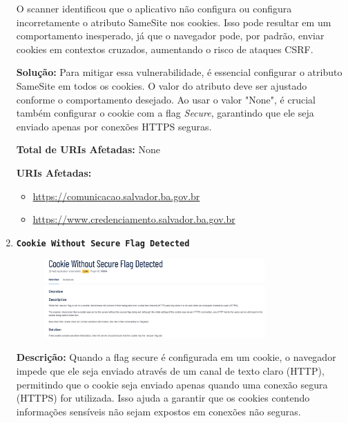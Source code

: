 \documentclass[a4paper,12pt]{article}
\begin{document}
\begin{enumerate}
O scanner identificou que o aplicativo não configura ou configura incorretamente o atributo SameSite nos cookies. Isso pode resultar em um comportamento inesperado, já que o navegador pode, por padrão, enviar cookies em contextos cruzados, aumentando o risco de ataques CSRF.

\textbf{Solução:} Para mitigar essa vulnerabilidade, é essencial configurar o atributo SameSite em todos os cookies. O valor do atributo deve ser ajustado conforme o comportamento desejado. Ao usar o valor "None", é crucial também configurar o cookie com a flag \textit{Secure}, garantindo que ele seja enviado apenas por conexões HTTPS seguras.

\textbf{Total de URIs Afetadas:} None

\textbf{URIs Afetadas:}
\begin{itemize}
    \item \url{https://comunicacao.salvador.ba.gov.br}
    \item \url{https://www.credenciamento.salvador.ba.gov.br}
\end{itemize}

\item \textbf{\texttt{Cookie Without Secure Flag Detected}}

                        \begin{figure}[h!]
                        \centering
                        \includegraphics[width=0.8\textwidth]{assets/images-was/Vulnerabilidades em Cookies e Segurança de Sessão/Cookie Without Secure Flag Detected.png}
                        \end{figure}
                        \FloatBarrier
                        \textbf{Descrição:} Quando a flag secure é configurada em um cookie, o navegador impede que ele seja enviado através de um canal de texto claro (HTTP), permitindo que o cookie seja enviado apenas quando uma conexão segura (HTTPS) for utilizada. Isso ajuda a garantir que os cookies contendo informações sensíveis não sejam expostos em conexões não seguras.


\end{enumerate}
\end{document}

